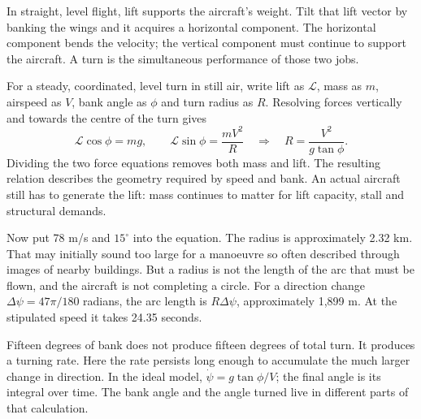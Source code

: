 \label{part:2}
In straight, level flight, lift supports the aircraft's weight. Tilt that lift vector by banking the wings and it acquires a horizontal component. The horizontal component bends the velocity; the vertical component must continue to support the aircraft. A turn is the simultaneous performance of those two jobs.

For a steady, coordinated, level turn in still air, write lift as $\mathcal L$, mass as $m$, airspeed as $V$, bank angle as $\phi$ and turn radius as $R$. Resolving forces vertically and towards the centre of the turn gives
\begin{equation}
\mathcal L\cos\phi=mg,\qquad \mathcal L\sin\phi=\frac{mV^2}{R}
\quad\Longrightarrow\quad R=\frac{V^2}{g\tan\phi}.
\label{eq:turn}
\end{equation}
Dividing the two force equations removes both mass and lift. The resulting relation describes the geometry required by speed and bank. An actual aircraft still has to generate the lift: mass continues to matter for lift capacity, stall and structural demands.


Now put 78 m/s and $15^\circ$ into the equation. The radius is approximately 2.32 km. That may initially sound too large for a manoeuvre so often described through images of nearby buildings. But a radius is not the length of the arc that must be flown, and the aircraft is not completing a circle. For a direction change $\Delta\psi=47\pi/180$ radians, the arc length is $R\Delta\psi$, approximately 1,899 m. At the stipulated speed it takes 24.35 seconds.

Fifteen degrees of bank does not produce fifteen degrees of total turn. It produces a turning rate. Here the rate persists long enough to accumulate the much larger change in direction. In the ideal model, $\dot\psi=g\tan\phi/V$; the final angle is its integral over time. The bank angle and the angle turned live in different parts of that calculation.


